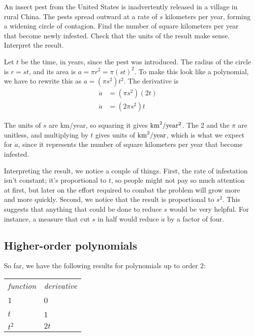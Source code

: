 \begin{eg}\label{pest}
\egquestion An insect pest from the United States is inadvertently released in
a village in rural China. The pests spread outward at a rate of $s$ kilometers
per year, forming a widening circle of contagion. Find the number of square
kilometers per year that become newly infested. Check that the units of the result
make sense. Interpret the result.

\eganswer Let $t$ be the time, in years, since the pest was introduced.
The radius of the circle is $r=st$, and its area is $a=\pi r^2=\pi(st)^2$.
To make this look like a polynomial, we have to rewrite this as
$a=(\pi s^2)t^2$. The derivative is
\begin{align*}
  \dot{a} &= (\pi s^2)(2t) \\
  \dot{a} &= (2\pi s^2) t
\end{align*}

The units of $s$ are km/year, so squaring it gives $\textup{km}^2/\textup{year}^2$.
The 2 and the $\pi$ are unitless, and multiplying by $t$ gives units
of $\textup{km}^2/\textup{year}$, which is what we expect for $\dot{a}$, since
it represents the number of square kilometers per year that become infested.

Interpreting the result, we notice a couple of things. First, the rate
of infestation isn't constant; it's proportional to $t$, so people might not
pay so much attention at first, but later on the effort required to combat the
problem will grow more and more quickly. Second, we notice that the
result is proportional to $s^2$. This suggests that anything that could be
done to reduce $s$ would be very helpful. For instance, a measure that cut
$s$ in half would reduce $\dot{a}$ by a factor of four.
\end{eg}

\subsection{Higher-order polynomials}

So far, we have the following results for polynomials up to order 2:

\begin{tabular}{ll}
\emph{function} & \emph{derivative} \\
1 & 0 \\
$t$ & 1 \\
$t^2$ & $2t$
\end{tabular}

